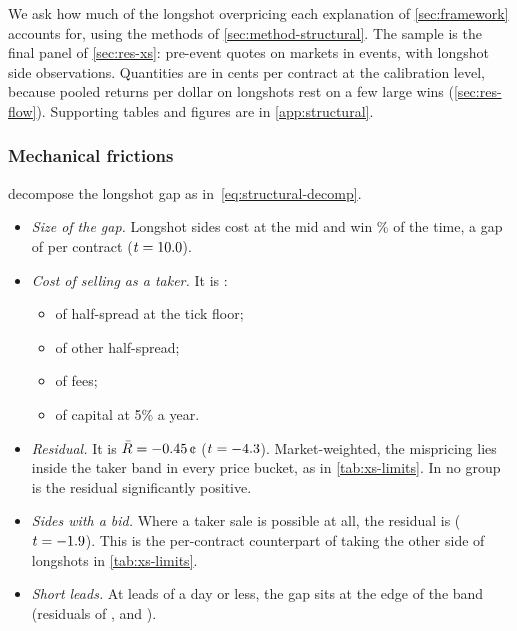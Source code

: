 
We ask how much of the longshot overpricing each explanation of \cref{sec:framework} accounts for, using the
methods of \cref{sec:method-structural}. The sample is the final panel of \cref{sec:res-xs}: \sdQuotes{} pre-event
quotes on \sdMarkets{} markets in \sdEvents{} events, with \sdLsSides{} longshot side observations. Quantities are
in cents per contract at the calibration level, because pooled returns per dollar on longshots rest on a few large
wins (\cref{sec:res-flow}). Supporting tables and figures are in \cref{app:structural}.

\subsubsection{Mechanical frictions}\label{sec:res-structural-band}

 decompose the longshot gap as in~\eqref{eq:structural-decomp}.
\begin{itemize}
  \item \emph{Size of the gap.} Longshot sides cost \sdLsPrice\cents{} at the mid and win \sdLsWin\% of the time,
  a gap of \sdLsGross\cents{} per contract ($t=10.0$).
  \item \emph{Cost of selling as a taker.} It is \sdLsBand\cents:
  \begin{itemize}
    \item \sdLsFloor{} of half-spread at the tick floor;
    \item \sdLsSpread{} of other half-spread;
    \item \sdLsFee{} of fees;
    \item \sdLsCap{} of capital at 5\% a year.
  \end{itemize}
  \item \emph{Residual.} It is $\bar R=\sdLsResid\cents$ ($t=-4.3$). Market-weighted, the mispricing lies
  inside the taker band in every price bucket, as in \cref{tab:xs-limits}. In no group is the residual
  significantly positive.
  \item \emph{Sides with a bid.} Where a taker sale is possible at all, the residual is \sdRobBidResid\cents{}
  ($t=-1.9$). This is the per-contract counterpart of taking the other side of longshots in
  \cref{tab:xs-limits}.
  \item \emph{Short leads.} At leads of a day or less, the gap sits at the edge of the band (residuals of
  \sdLeadOneHResid, \sdLeadSixHResid{} and \sdLeadOneDResid\cents).
\end{itemize}

